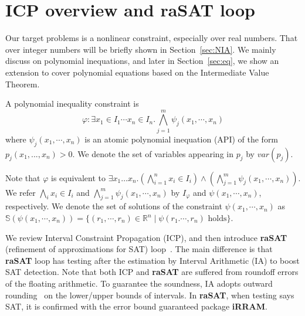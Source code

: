 \documentclass[runningheads,a4paper,oribibl]{llncs}
\newcommand{\Real}{{\mathbb R}}
\begin{document}

\section{ICP overview and \textbf{raSAT} loop}
\label{sec:raSATloop} 

\sloppy

Our target problems is a nonlinear constraint, especially over real numbers. 
That over integer numbers will be briefly shown in Section~\ref{sec:NIA}.
We mainly discuss on polynomial inequations, and later in Section~\ref{sec:eq},
we show an extension to cover polynomial equations based on the
Intermediate Value Theorem. 

\begin{definition}
A polynomial inequality constraint is
\[\varphi: \exists x_1 \in I_1 \cdots x_n \in I_n. \bigwedge
\limits_{j=1}^m \psi_j(x_1,\cdots,x_n)\]
where $\psi_j(x_1,\cdots,x_n)$ is an atomic polynomial inequation (API) of
the form $p_j(x_1,...,x_n) > 0$. %
We denote the set of variables appearing in $p_j$ by $var(p_j)$. 
\end{definition}

Note that $\varphi$ is equivalent to 
${\exists x_1 \ldots x_n. (\bigwedge \limits_{i=1}^n x_i \in I_i) \wedge
  (\bigwedge \limits_{j=1}^m \psi_j(x_1,\cdots,x_n))}$. 
We refer ${\bigwedge \limits_i x_i \in I_i}$ and $\bigwedge \limits_{j=1}^m \psi_j(x_1,\cdots,x_n)$
by $I_{\varphi}$ and $\psi(x_1,\cdots,x_n)$, respectively. 
We denote the set of solutions of the constraint $\psi(x_1,\cdots, x_n)$ as
${\mathbb{S}(\psi(x_1,\cdots, x_n)) = \{(r_1,\cdots, r_n) \in \Real^n \mid
  \psi(r_1. \cdots, r_n) \text{ holds}\}}$.

We review Interval Constraint Propagation (ICP)\cite{benhamou:hal-00480814}, and then introduce
\textbf{raSAT} (refinement of approximations for SAT) loop~\cite{VanKhanh201227}.
The main difference is that {\bf raSAT} loop has testing after the estimation
by Interval Arithmetic (IA) to boost SAT detection.
Note that both ICP and {\bf raSAT} are suffered from roundoff errors of
the floating arithmetic. To guarantee the soundness, IA adopts
outward rounding~\cite{Hickey:2001:IAP:502102.502106} on the lower/upper bounds of intervals.
In {\bf raSAT}, when testing says SAT, it is confirmed with
the error bound guaranteed package {\bf iRRAM}. 
\end{document}
